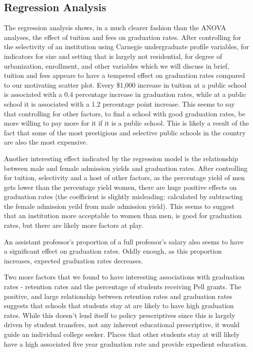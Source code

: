 \documentclass{article}
\begin{document}
\subsection{Regression Analysis}

The regression analysis shows, in a much clearer fashion than the ANOVA analyses, the effect of tuition and fees on graduation rates. After controlling for the selectivity of an institution using Carnegie undergraduate profile variables, for indicators for size and setting that is largely not residential, for degree of urbanization, enrollment, and other variables which we will discuss in brief, tuition and fees appears to have a tempered effect on graduation rates compared to our motivating scatter plot. Every \$1,000 increase in tuition at a public school is associated with a 0.4 percentage increase in graduation rates, while at a public school it is associated with a 1.2 percentage point increase. This seems to say that controlling for other factors, to find a school with good graduation rates, be more willing to pay more for it if it is a public school. This is likely a result of the fact that some of the most prestigious and selective public schools in the country are also the most expensive.

Another interesting effect indicated by the regression model is the relationship between male and female admission yields and graduation rates. After controlling for tuition, selectivity and a host of other factors, as the percentage yield of men gets lower than the percentage yield women, there are huge positive effects on graduation rates (the coefficient is slightly misleading: calculated by subtracting the female admission yeild from male admission yield). This seems to suggest that an institution more acceptable to women than men, is good for graduation rates, but there are likely more factors at play.

An assistant professor's proportion of a full professor's salary also seems to have a significant effect on graduation rates. Oddly enough, as this proportion increases, expected graduation rates decreases.

Two more factors that we found to have interesting associations with graduation rates - retention rates and the percentage of students receiving Pell grants. The positive, and large relationship between retention rates and graduation rates suggests that schools that students stay at are likely to have high graduation rates. While this doesn't lend itself to policy prescriptives since this is largely driven by student transfers, not any inherent educational prescriptive, it would guide an individual college seeker. Places that other students stay at will likely have a high associated five year graduation rate and provide expedient education. 
\end{document}
